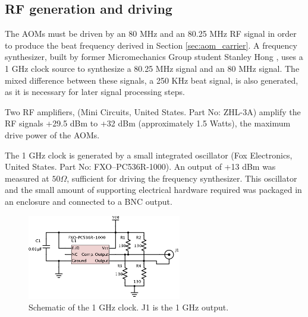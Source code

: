 
\subsection{RF generation and driving}

The AOMs must be driven by an 80 MHz and an 80.25 MHz RF signal in order to produce the beat frequency derived in Section \ref{sec:aom_carrier}. A frequency synthesizer, built by former Micromechanics Group student Stanley Hong \cite{hong}, uses a 1 GHz clock source to synthesize a 80.25 MHz signal and an 80 MHz signal. The mixed difference between these signals, a 250 KHz beat signal, is also generated, as it is necessary for later signal processing steps.

Two RF amplifiers, (Mini Circuits, United States. Part No: ZHL-3A) amplify the RF signals +29.5 dBm to +32 dBm (approximately 1.5 Watts), the maximum drive power of the AOMs.

The 1 GHz clock is generated by a small integrated oscillator (Fox Electronics, United States. Part No: FXO–PC536R-1000). An output of +13 dBm was measured at $50\Omega$, sufficient for driving the frequency synthesizer. This oscillator and the small amount of supporting electrical hardware required was packaged in an enclosure and connected to a BNC output.

\begin{figure}[h!]
\centering
\includegraphics[width=0.6\textwidth]{Images/Schematics/1ghzclock_2.png}
\caption[Schematic of the 1 GHz clock.]{Schematic of the 1 GHz clock. J1 is the 1 GHz output.}
\end{figure}

